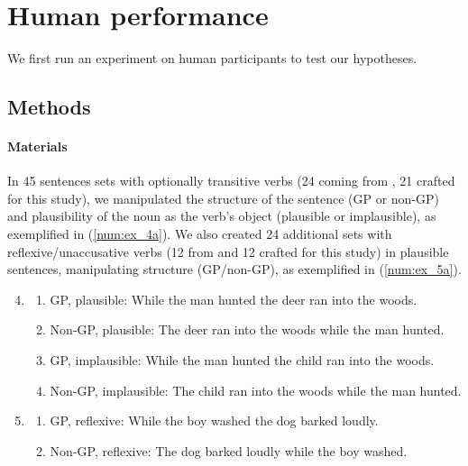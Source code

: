 \section{Human performance}

We first run an experiment on human participants to test our hypotheses.

\subsection{Methods}

\paragraph{Materials} 
In 45 sentences sets with optionally transitive verbs (24 coming from \citet{christianson2001}, 21 crafted for this study), we manipulated the structure of the sentence (GP or non-GP) and plausibility of the noun as the verb's object (plausible or implausible), as exemplified in (\ref{num:ex_4a}). We also created 24 additional sets with reflexive/unaccusative verbs (12 from \citet{christianson2001} and 12 crafted for this study) in plausible sentences, manipulating structure (GP/non-GP), as exemplified in (\ref{num:ex_5a}). 

\begin{enumerate}[nosep]
    \setcounter{enumi}{3}
    \small \item \label{num:ex_4a} \begin{enumerate}[nosep]
        \item GP, plausible: While the man hunted the deer ran into the woods.
        \item Non-GP, plausible: The deer ran into the woods while the man hunted. 
        \item GP, implausible: While the man hunted the child ran into the woods.
        \item Non-GP, implausible: The child ran into the woods while the man hunted.
        \end{enumerate}
        \item \label{num:ex_5a} \begin{enumerate}[nosep]
            \item  GP, reflexive: While the boy washed the dog barked loudly.
            \item Non-GP, reflexive: The dog barked loudly while the boy washed.
        \end{enumerate}
    \end{enumerate}

